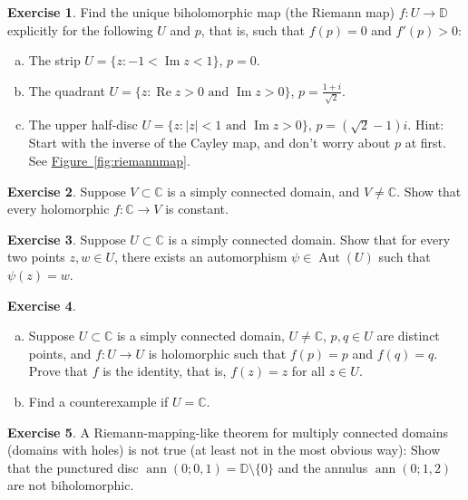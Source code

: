 \documentclass[12pt,openany]{book}
\newcommand{\ann}{\operatorname{ann}}
\renewcommand{\Re}{\operatorname{Re}}
\renewcommand{\Im}{\operatorname{Im}}
\newcommand{\Aut}{\operatorname{Aut}}
\newcommand{\sabs}[1]{\lvert {#1} \rvert}
\newcommand{\C}{{\mathbb{C}}}
\newcommand{\D}{{\mathbb{D}}}
\theoremstyle{plain}
\theoremstyle{remark}
\theoremstyle{definition}
\newenvironment{exbox}{%
    \def\FrameCommand{\vrule width 1pt \relax\hspace{10pt}}%
    \MakeFramed{\advance\hsize-\width\FrameRestore}%
}{%
    \endMakeFramed
}
\newenvironment{exparts}{%
    \leavevmode\begin{enumerate}[a),noitemsep,topsep=0pt,parsep=0pt,partopsep=0pt]
}{%
    \end{enumerate}
}
\theoremstyle{exercise}
\newtheorem{exercise}{Exercise}[section]
\theoremstyle{example}
\newcommand{\figureref}[1]{\hyperref[#1]{Figure~\ref*{#1}}}
\begin{document}
\begin{exbox}
\begin{exercise} \label{exercise:explicitriemann}
Find the unique biholomorphic map (the Riemann map)
$f \colon U \to \D$ explicitly
for the following $U$ and $p$, that is,
such that $f(p) = 0$ and $f'(p) > 0$:
\begin{exparts}
\item
The strip $U = \{ z : -1 < \Im z < 1 \}$, $p=0$.
\item
The quadrant $U = \{ z : \Re z > 0 \text{ and } \Im z > 0 \}$,
$p=\frac{1+i}{\sqrt{2}}$.
\item
The upper half-disc $U = \{ z : \sabs{z} < 1 \text{ and } \Im z > 0 \}$, $p
= (\sqrt{2}-1)i$.  Hint:  Start with the inverse of the Cayley map, and
don't worry about $p$ at first.  See \figureref{fig:riemannmap}.
\end{exparts}
\end{exercise}

\begin{exercise}
Suppose $V \subset \C$ is a simply connected domain, and $V \neq \C$.
Show that every holomorphic $f \colon \C \to V$ is constant.
\end{exercise}

\begin{exercise}
Suppose $U \subset \C$ is a simply connected domain.
Show that for every two points $z,w \in U$, there exists an automorphism
$\psi \in \Aut(U)$ such that $\psi(z) = w$.
\end{exercise}

\begin{exercise}
\begin{exparts}
\item
Suppose $U \subset \C$ is a simply connected domain, $U \neq \C$,
$p,q \in U$ are distinct points, and
$f \colon U \to U$ is holomorphic such that $f(p) = p$ and $f(q)=q$.
Prove that $f$ is the identity, that is, $f(z)=z$ for all $z \in U$.
\item
Find a counterexample if $U=\C$.
\end{exparts}
\end{exercise}

\begin{exercise}
A Riemann-mapping-like theorem for multiply connected domains (domains with
holes) is not true
(at least not in the most obvious way):
Show that the punctured disc $\ann(0;0,1) = \D \setminus \{ 0 \}$
and the annulus $\ann(0;1,2)$ are not biholomorphic.
\end{exercise}


\end{exbox}
\end{document}
